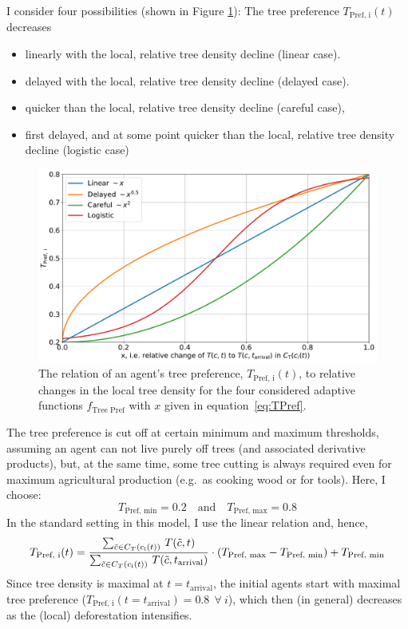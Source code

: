 I consider four possibilities (shown in Figure \ref{fig:TPref_T}): The tree preference $T_\text{Pref, i}(t)$ decreases
\begin{itemize}
	\item linearly with the local, relative tree density decline (linear case).  
	\item delayed with the local, relative tree density decline (delayed case).
	\item quicker than the local, relative tree density decline (careful case),
	\item first delayed, and at some point quicker than the local, relative tree density decline (logistic case) 
\end{itemize}
\begin{figure}
	\centering
	\includegraphics[width=\textwidth]{images/TPref}
	\caption{The relation of an agent's tree preference, $T_\text{Pref, i}(t)$, to relative changes in the local tree density for the four considered adaptive functions $f_\text{Tree Pref}$ with $x$ given in equation~\ref{eq:TPref}.}
	\label{fig:TPref_T}
\end{figure}
The tree preference is cut off at certain minimum and maximum thresholds, assuming an agent can not live purely off trees (and associated derivative products), but, at the same time, some tree cutting is always required even for maximum agricultural production (e.g.\ as cooking wood or for tools). 
Here, I choose: 
\begin{equation}
T_\text{Pref, min} = 0.2 \quad \text{and} \quad T_\text{Pref, max} = 0.8
\end{equation} 
In the standard setting in this model, I use the linear relation and, hence, 
\begin{equation}
	T_\text{Pref, i}(t) =  \frac{\sum_{\tilde{c} \in C_{T}(c_{\rm i}(t)) } \, T(\tilde{c}, t)}{\sum_{\tilde{c} \in C_{T}(c_{\rm i}(t))} \, T(\tilde{c}, t_\text{arrival}) } \cdot (T_\text{Pref, max}-T_\text{Pref, min}) + T_\text{Pref, min}
\end{equation}
Since tree density is maximal at $t=t_\text{arrival}$, the initial agents start with maximal tree preference ($T_\text{Pref, i}(t=t_\text{arrival}) = 0.8 \ \  \forall \ i$), which then (in general) decreases as the (local) deforestation intensifies.

